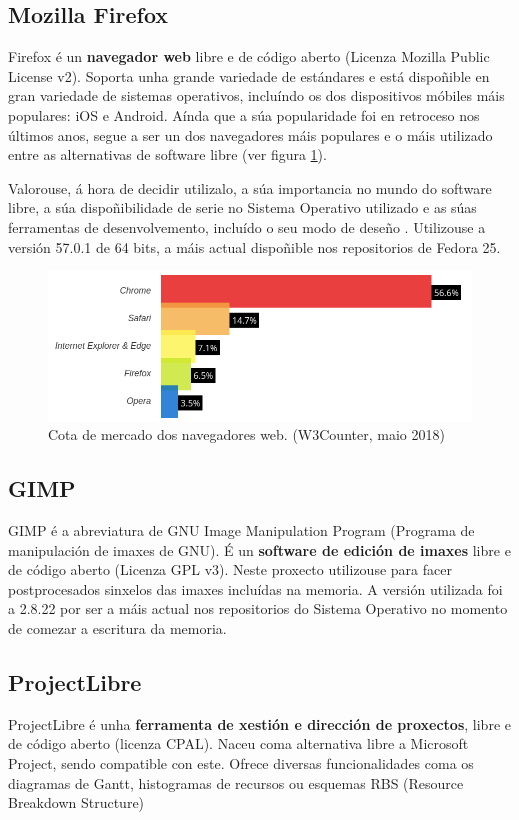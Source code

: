 \subsection{Mozilla Firefox}

Firefox é un \textbf{navegador web} libre e de código aberto (Licenza Mozilla Public License v2\cite{firefox}). Soporta unha grande variedade de estándares e está dispoñible en gran variedade de sistemas operativos, incluíndo os dos dispositivos móbiles máis populares: iOS e Android. Aínda que a súa popularidade foi en retroceso nos últimos anos, segue a ser un dos navegadores máis populares e o máis utilizado entre as alternativas de software libre (ver figura \ref{fig:firefox}).

Valorouse, á hora de decidir utilizalo, a súa importancia no mundo do software libre, a súa dispoñibilidade de serie no Sistema Operativo utilizado e as súas ferramentas de desenvolvemento, incluído o seu modo de deseño . Utilizouse a versión 57.0.1 de 64 bits, a máis actual dispoñible nos repositorios de Fedora 25.  

\begin{figure}[h]
	\centering
	\includegraphics[scale=0.5,keepaspectratio=true]{./images/firefox.png}
	\caption{Cota de mercado dos navegadores web. (W3Counter, maio 2018)\cite{firefox2}}
	\label{fig:firefox}
\end{figure}



\subsection{GIMP}

GIMP é a abreviatura de GNU Image Manipulation Program (Programa de manipulación de imaxes de GNU). É un \textbf{software de edición de imaxes} libre e de código aberto (Licenza GPL v3\cite{gimp}). Neste proxecto utilizouse para facer postprocesados sinxelos das imaxes incluídas na memoria. A versión utilizada foi a 2.8.22 por ser a máis actual nos repositorios do Sistema Operativo no momento de comezar a escritura da memoria.

\subsection{ProjectLibre}

ProjectLibre é unha \textbf{ferramenta de xestión e dirección de proxectos}, libre e de código aberto (licenza CPAL\cite{projectlibre}). Naceu coma alternativa libre a Microsoft Project, sendo compatible con este. Ofrece diversas funcionalidades coma os diagramas de Gantt, histogramas de recursos ou esquemas RBS (Resource Breakdown Structure) 
